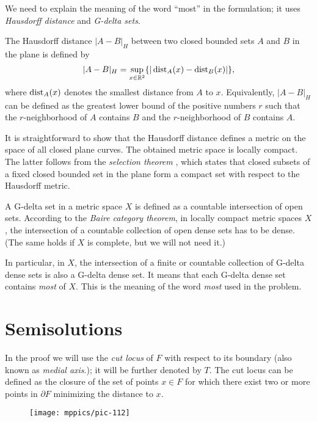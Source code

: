 We need to explain the meaning of the word ``most'' in the formulation;
it uses \emph{Hausdorff distance} and \emph{G-delta sets}.

The Hausdorff distance $|A-B|_H$ between two closed bounded sets $A$ and $B$ in the plane is defined by 
\[|A-B|_H=\sup_{x\in\mathbb{R}^2}\{|\operatorname{\rm dist}\nolimits_A(x)-\operatorname{\rm dist}\nolimits_B(x)|\},\]
where $\operatorname{\rm dist}\nolimits_A(x)$ denotes the smallest distance from $A$ to $x$.
Equivalently, $|A-B|_H$ can be defined as the greatest lower bound of the positive numbers $r$ such that the $r$-neighborhood of $A$ contains $B$ and the $r$-neighborhood of $B$ contains $A$.

It is straightforward to show that the Hausdorff distance defines a metric on the space of all closed plane curves.
The obtained metric space is locally compact.
The latter follows from the \emph{selection theorem} \cite[see \S18 in][]{blaschke},
which states that closed subsets of a fixed closed bounded set in the plane form a compact set with respect to the Hausdorff metric. 

A G-delta set in a metric space $X$ is defined as a countable intersection of open sets.
According to the \emph{Baire category theorem}, 
in locally compact metric spaces $X$,
the intersection of a countable collection of open dense sets 
has to be dense.
(The same holds if $X$ is complete, but we will not need it.)

In particular, in $X$, 
the intersection of a finite or countable collection of G-delta dense sets is also a G-delta dense set. 
It means that each G-delta dense set contains {}\emph{most} of $X$.
This is the meaning of the word {}\emph{most} used in the problem.



\section*{Semisolutions}


In the proof we will use the \emph{cut locus}
of $F$ with respect to its boundary (also known as \emph{medial axis}.);
it will be further denoted by $T$.
The cut locus can be defined as the closure
of the set of points $x\in F$ 
for which there exist two or more points in $\partial F$ minimizing the distance to $x$.

\begin{wrapfigure}{r}{36 mm}
\vskip-2mm
\centering
\texttt{[image: mppics/pic-112]}
\end{wrapfigure}

